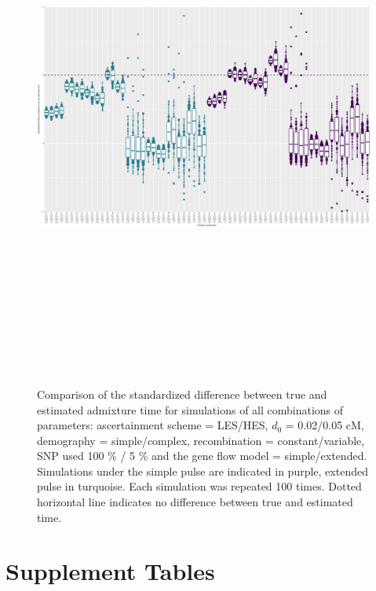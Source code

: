 \documentclass[11pt]{article}
\begin{document}
\begin{figure}
\centering
\includegraphics[width=16cm,height=18cm,keepaspectratio]{ATE_Revisions_files/figure-latex/figS2_updated-1.pdf}
\caption{\label{fig:figS2_2} Comparison of the standardized difference between true and estimated admixture time for simulations of all combinations of parameters: ascertainment scheme = LES/HES,  $d_{0}$ = 0.02/0.05 cM, demography = simple/complex, recombination = constant/variable, SNP used 100 \% / 5 \% and the gene flow model = simple/extended. Simulations under the simple pulse are indicated in purple, extended pulse in turquoise. Each simulation was repeated 100 times. Dotted horizontal line indicates no difference between true and estimated time.}
\end{figure}



\section{Supplement Tables}
\end{document}
